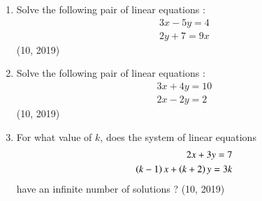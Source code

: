 \begin{enumerate}[label=\thesubsection.\arabic*,ref=\thesubsection.\theenumi]
\item Solve the following pair of linear equations :
\begin{align*}
 3x - 5y = 4\\
2y + 7 = 9x   
\end{align*}    
\hfill (10, 2019)

\item Solve the following pair of linear equations :
\begin{align*}
 3x + 4y = 10\\
2x - 2y = 2   
\end{align*}    
\hfill (10, 2019)
\item For what value of $k$, does the system of linear equations
\begin{align*}
   2x + 3y = 7\\
 \left(k - 1\right) x + \left(k + 2\right) y = 3k
\end{align*}
have an infinite number of solutions ?
\hfill (10, 2019)
\end{enumerate}
